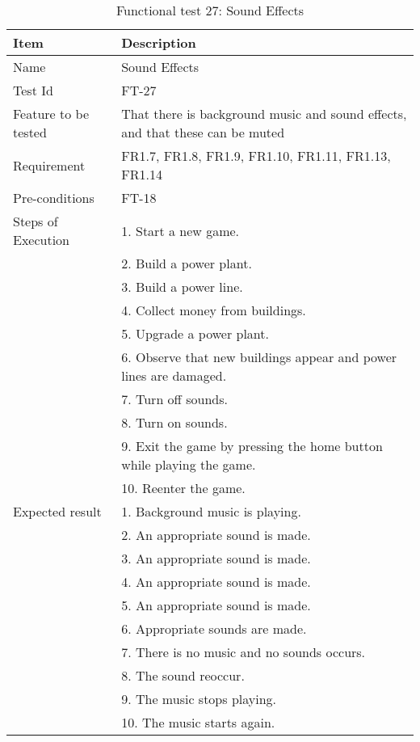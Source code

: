 \begin{table}[H]
\centering
	\begin{tabular}{ l | p{8cm} }
		\hline
		\rowcolor{lightgray}
		{\bf Item} & {\bf Description} \\ \hline
		Name & Sound Effects \\ 
		Test Id & FT-27 \\ 
		Feature to be tested & That there is background music and sound effects, and that these can be muted \\ 
		Requirement & FR1.7, FR1.8, FR1.9, FR1.10, FR1.11, FR1.13, FR1.14 \\ 
		Pre-conditions & FT-18 \\ 
		Steps of Execution & 1. Start a new game. \\
		& 2. Build a power plant. \\
		& 3. Build a power line. \\
		& 4. Collect money from buildings. \\
		& 5. Upgrade a power plant. \\
		& 6. Observe that new buildings appear and power lines are damaged. \\
		& 7. Turn off sounds. \\
		& 8. Turn on sounds. \\
		& 9. Exit the game by pressing the home button while playing the game. \\
		& 10. Reenter the game. \\
		Expected result & 1. Background music is playing. \\
		& 2. An appropriate sound is made. \\
		& 3. An appropriate sound is made. \\
		& 4. An appropriate sound is made. \\
		& 5. An appropriate sound is made. \\
		& 6. Appropriate sounds are made. \\
		& 7. There is no music and no sounds occurs. \\
		& 8. The sound reoccur. \\
		& 9. The music stops playing. \\
		& 10. The music starts again. \\
		\hline
	\end{tabular}
	\caption{Functional test 27: Sound Effects}
\end{table}

